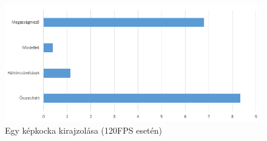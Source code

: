 \begin{figure}[h]
\centering
\includegraphics[scale=0.84]{kepek/frame_draw_diag.png}
\caption{Egy képkocka kirajzolása (120FPS esetén)}
\label{fig:frame_draw}
\end{figure}
